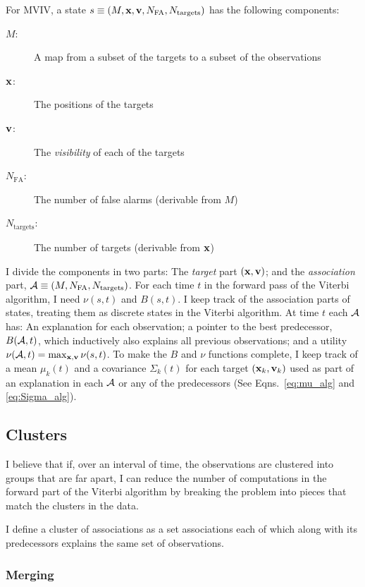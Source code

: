 \documentclass[12pt]{article}
\newcommand{\cA}{{\cal A}}
\begin{document}
For MVIV, a state $s \equiv (M, {\mathbf{x}}, {\mathbf{v}}, N_{\text{FA}},
N_{\text{targets}})$ has the following components:
\begin{description}
\item[$M$:] A map from a subset of the targets to a subset of the observations
\item[${\mathbf{x}}$:] The positions of the targets
\item[${\mathbf{v}}$:] The \emph{visibility} of each of the targets
\item[$N_{\text{FA}}$:] The number of false alarms (derivable from $M$)
\item[$N_{\text{targets}}$:] The number of targets (derivable from ${\mathbf{x}}$)
\end{description}
I divide the components in two parts: The \emph{target} part
$({\mathbf{x}},{\mathbf{v}})$; and the \emph{association} part, $\cA \equiv (M,
N_{\text{FA}}, N_{\text{targets}})$.  For each time $t$ in the forward
pass of the Viterbi algorithm, I need $\nu(s,t)$ and $B(s,t)$.  I keep
track of the association parts of states, treating them as discrete
states in the Viterbi algorithm.  At time $t$ each $\cA$ has: An
explanation for each observation; a pointer to the best predecessor,
$B(\cA,t)$, which inductively also explains all previous observations;
and a utility $\nu(\cA,t) = \max_{\bx,\bv} \nu(s,t)$.  To make the $B$
and $\nu$ functions complete, I keep track of a mean $\mu_k(t)$ and a
covariance $\Sigma_k(t)$ for each target $({\mathbf{x}}_k,{\mathbf{v}}_k)$ used as part
of an explanation in each $\cA$ or any of the predecessors (See
Eqns.~\eqref{eq:mu_alg} and \eqref{eq:Sigma_alg}).

\subsection{Clusters}
\label{sec:clusters}

I believe that if, over an interval of time, the observations are
clustered into groups that are far apart, I can reduce the number of
computations in the forward part of the Viterbi algorithm by breaking
the problem into pieces that match the clusters in the data.

I define a cluster of associations as a set associations each of which
along with its predecessors explains the same set of observations.

\subsubsection{Merging}
\label{sec:merging}
\end{document}
